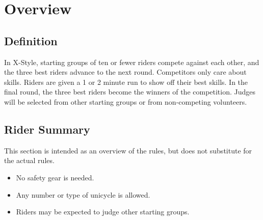\chapter{Overview}

\section{Definition}

In X-Style, starting groups of ten or fewer riders compete against each other, and the three best riders advance to the next round.
Competitors only care about skills.
Riders are given a 1 or 2 minute run to show off their best skills.
In the final round, the three best riders become the winners of the competition.
Judges will be selected from other starting groups or from non-competing volunteers.

\section{Rider Summary}

This section is intended as an overview of the rules, but does not substitute for the actual rules.
\begin{itemize}
\item No safety gear is needed.
\item Any number or type of unicycle is allowed.
\item Riders may be expected to judge other starting groups.
\end{itemize}

